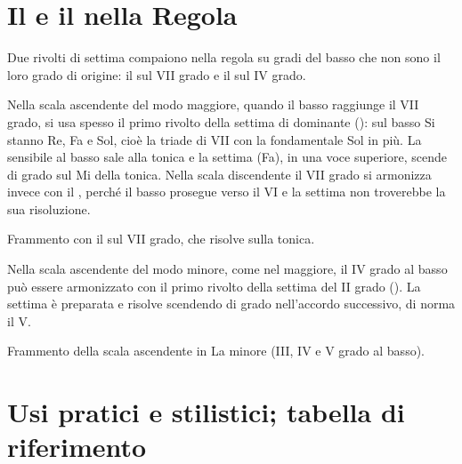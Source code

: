 \section{Il  e il  nella Regola}
\label{sec:rivolti_regola}

Due rivolti di settima compaiono nella regola su gradi del basso che non sono il loro grado di origine: il  sul VII grado e il  sul IV grado.

\begin{regola}
	\label{reg:vii65_regola}
	Nella scala ascendente del modo maggiore, quando il basso raggiunge il VII grado, si usa spesso il primo rivolto della settima di dominante (): sul basso Si stanno Re, Fa e Sol, cioè la triade di VII con la fondamentale Sol in più. La sensibile al basso sale alla tonica e la settima (Fa), in una voce superiore, scende di grado sul Mi della tonica. Nella scala discendente il VII grado si armonizza invece con il , perché il basso prosegue verso il VI e la settima non troverebbe la sua risoluzione.
\end{regola}

\begin{esempio}
	\label{ex:vii65_regola_maggiore}
	Frammento con il  sul VII grado, che risolve sulla tonica.
\end{esempio}

\begin{regola}
	\label{reg:ii65_regola_minore}
	Nella scala ascendente del modo minore, come nel maggiore, il IV grado al basso può essere armonizzato con il primo rivolto della settima del II grado (). La settima è preparata e risolve scendendo di grado nell'accordo successivo, di norma il V.
\end{regola}

\begin{esempio}
	\label{ex:ii65_regola_minore}
	Frammento della scala ascendente in La minore (III, IV e V grado al basso).
\end{esempio}

\section{Usi pratici e stilistici; tabella di riferimento}
\label{sec:usi_pratici_completi}

